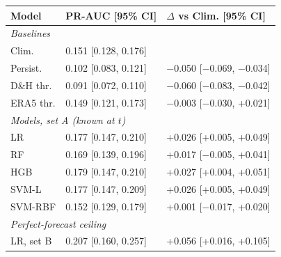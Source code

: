 \begin{tabular}{lll}
\toprule
Model & PR-AUC [95\% CI] & $\Delta$ vs Clim. [95\% CI] \\
\midrule
\multicolumn{3}{l}{\textit{Baselines}} \\
Clim. & 0.151 [0.128, 0.176] &  \\
Persist. & 0.102 [0.083, 0.121] & $-$0.050 [$-$0.069, $-$0.034] \\
D\&H thr. & 0.091 [0.072, 0.110] & $-$0.060 [$-$0.083, $-$0.042] \\
ERA5 thr. & 0.149 [0.121, 0.173] & $-$0.003 [$-$0.030, +0.021] \\
\midrule\multicolumn{3}{l}{\textit{Models, set A (known at $t$)}} \\
LR & 0.177 [0.147, 0.210] & +0.026 [+0.005, +0.049] \\
RF & 0.169 [0.139, 0.196] & +0.017 [$-$0.005, +0.041] \\
HGB & 0.179 [0.147, 0.210] & +0.027 [+0.004, +0.051] \\
SVM-L & 0.177 [0.147, 0.209] & +0.026 [+0.005, +0.049] \\
SVM-RBF & 0.152 [0.129, 0.179] & +0.001 [$-$0.017, +0.020] \\
\midrule\multicolumn{3}{l}{\textit{Perfect-forecast ceiling}} \\
LR, set B & 0.207 [0.160, 0.257] & +0.056 [+0.016, +0.105] \\
\bottomrule
\end{tabular}
